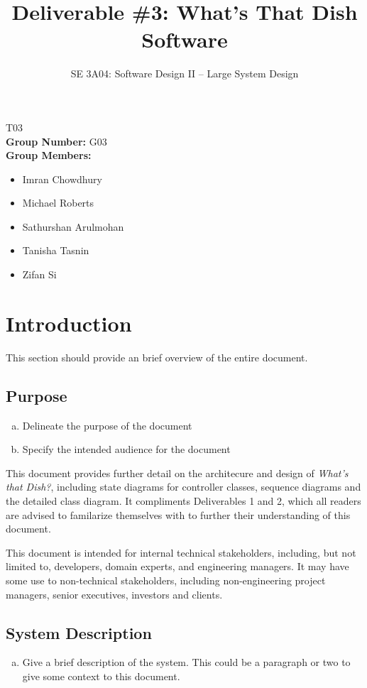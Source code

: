 \documentclass[]{article}
\title{Deliverable \#3: What’s That Dish Software}
\author{SE 3A04: Software Design II -- Large System Design}
\date{}
\begin{document}
\maketitle	
{} T03\\
{\bf Group Number:} G03 \\
{\bf Group Members:} 
\begin{itemize}
	\item Imran Chowdhury
	\item Michael Roberts
	\item Sathurshan Arulmohan
	\item Tanisha Tasnin
	\item Zifan Si
\end{itemize}

\section{Introduction}
\label{sec:introduction}

This section should provide an brief overview of the entire document.

\subsection{Purpose}
\label{sub:purpose}
\begin{enumerate}[a)]
	\item Delineate the purpose of the document
	\item Specify the intended audience for the document
\end{enumerate}

This document provides further detail on the architecure and design of \textit{What's that Dish?}, including state diagrams for controller classes,
sequence diagrams and the detailed class diagram. It compliments Deliverables 1 and 2, which all readers are advised to familarize themselves with
to further their understanding of this document.

This document is intended for internal technical stakeholders, including, but not limited to, developers, domain experts,
and engineering managers. It may have some use to non-technical stakeholders, including non-engineering project managers,
senior executives, investors and clients.



\subsection{System Description}
\label{sub:system_description}
\begin{enumerate}[a)]
	\item Give a brief description of the system. This could be a paragraph or two to give some context to this document.
\end{enumerate}
\end{document}
